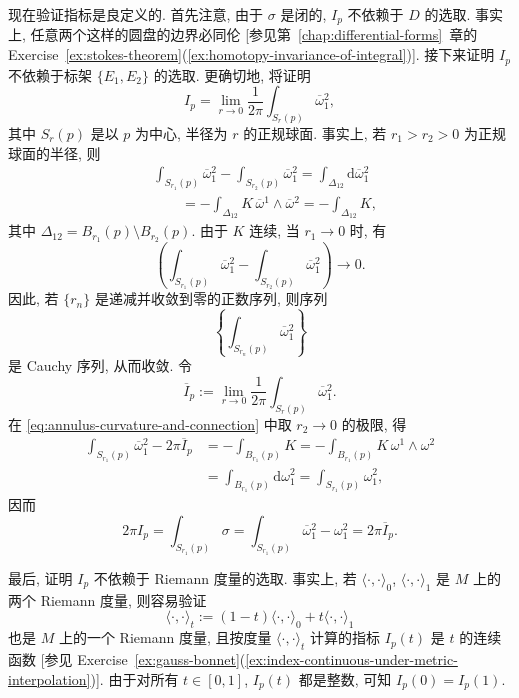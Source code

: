 现在验证指标是良定义的. 首先注意, 由于 $\sigma$ 是闭的, $I_p$ 不依赖于 $D$ 的选取. 事实上, 任意两个这样的圆盘的边界必同伦 [参见第~\ref{chap:differential-forms}~章的 Exercise~\ref{ex:stokes-theorem}(\ref{ex:homotopy-invariance-of-integral})]. 接下来证明 $I_p$ 不依赖于标架 $\{E_1,E_2\}$ 的选取. 更确切地, 将证明
\[
  I_p=\lim_{r\to0}\frac1{2\pi}\int_{S_r(p)}\overline\omega{}_1^2,
\]
其中 $S_r(p)$ 是以 $p$ 为中心, 半径为 $r$ 的正规球面. 事实上, 若 $r_1>r_2>0$ 为正规球面的半径, 则
\begin{equation}\label{eq:annulus-curvature-and-connection}
\begin{aligned}
 &\int_{S_{r_1}(p)}\overline\omega{}_1^2-\int_{S_{r_2}(p)}\overline\omega{}_1^2
  =\int_{\Delta_{12}}\mathrm{d}\overline\omega{}_1^2\\
 &\qquad=-\int_{\Delta_{12}}K\,\overline\omega{}^1\wedge\overline\omega{}^2
  =-\int_{\Delta_{12}}K,
\end{aligned}
\end{equation}
其中 $\Delta_{12}=B_{r_1}(p)\setminus B_{r_2}(p)$. 由于 $K$ 连续, 当 $r_1\to0$ 时, 有
\[
  \left(\int_{S_{r_1}(p)}\overline\omega{}_1^2-\int_{S_{r_2}(p)}\overline\omega{}_1^2\right)\longrightarrow0.
\]
因此, 若 $\{r_n\}$ 是递减并收敛到零的正数序列, 则序列
\[
  \left\{\int_{S_{r_n}(p)}\overline\omega{}_1^2\right\}
\]
是 Cauchy 序列, 从而收敛. 令
\[
  \overline I_p:=\lim_{r\to0}\frac1{2\pi}\int_{S_r(p)}\overline\omega{}_1^2.
\]
在 \eqref{eq:annulus-curvature-and-connection} 中取 $r_2\to0$ 的极限, 得
\begin{align*}
  \int_{S_{r_1}(p)}\overline\omega{}_1^2-2\pi\overline I_p
  &=-\int_{B_{r_1}(p)}K=-\int_{B_{r_1}(p)}K\,\omega^1\wedge\omega^2\\
  &=\int_{B_{r_1}(p)}\mathrm{d}\omega_1^2=\int_{S_{r_1}(p)}\omega_1^2,
\end{align*}
因而
\[
  2\pi I_p=\int_{S_{r_1}(p)}\sigma
    =\int_{S_{r_1}(p)}\overline\omega{}_1^2-\omega_1^2=2\pi\overline I_p.
\]

最后, 证明 $I_p$ 不依赖于 Riemann 度量的选取. 事实上, 若 $\langle\cdot,\cdot\rangle_0$, $\langle\cdot,\cdot\rangle_1$ 是 $M$ 上的两个 Riemann 度量, 则容易验证
\[
  \langle\cdot,\cdot\rangle_t:=(1-t)\langle\cdot,\cdot\rangle_0+t\langle\cdot,\cdot\rangle_1
\]
也是 $M$ 上的一个 Riemann 度量, 且按度量 $\langle\cdot,\cdot\rangle_t$ 计算的指标 $I_p(t)$ 是 $t$ 的连续函数 [参见 Exercise~\ref{ex:gauss-bonnet}(\ref{ex:index-continuous-under-metric-interpolation})]. 由于对所有 $t\in[0,1]$, $I_p(t)$ 都是整数, 可知 $I_p(0)=I_p(1)$.

